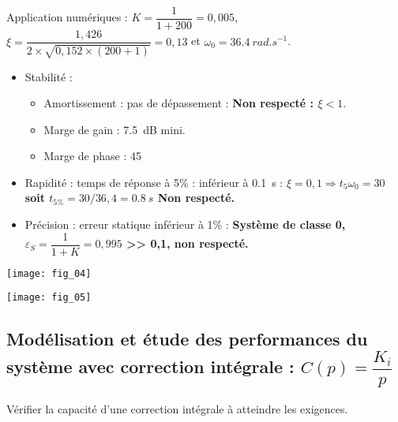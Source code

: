 \begin{multicols}{2}
\begin{corrige}
Application numériques : 
$K = \dfrac{1}{1+200} = 0,005$, $\xi = \dfrac{1,426}{2 \times  \sqrt{0,152\times (200 +1)}}=0,13$ et $\omega_0 = \SI{36,4}{rad.s^{-1}}$.
\end{corrige}
\else
\fi

\ifprof
\begin{corrige}
\begin{itemize}
\item Stabilité : 
\begin{itemize}
\item Amortissement : pas de dépassement : \textbf{Non respecté : $\xi <1$}. 
\item Marge de gain : \SI{7,5}{dB} mini.
\item Marge de phase : \SI{45}{\degres} 
\end{itemize}
\item Rapidité : temps de réponse à 5\% : inférieur à \SI{0,1}{s} : \textbf{$\xi = 0,1 \Rightarrow t_5\omega_0 = 30$ soit $t_{5\%} = 30 / 36,4 =\SI{0,8}{s}$ Non respecté.}
\item Précision : erreur statique inférieur à 1\%  : \textbf{Système de classe 0, $\varepsilon_S = \dfrac{1}{1+K} = 0,995$  >> 0,1, non respecté.}
\end{itemize}
\end{corrige}
\else
\fi


\begin{center}
\texttt{[image: fig\_04]}
\end{center}


\begin{center}
\texttt{[image: fig\_05]}
\end{center}

\subsection*{Modélisation et étude des performances du système avec correction intégrale : $C(p) = \dfrac{K_i}{p}$}

\begin{obj}
Vérifier la capacité d’une correction intégrale à atteindre les exigences.
\end{obj}

\ifprof
\begin{corrige}
\end{corrige}
\else
\fi


\end{multicols}
